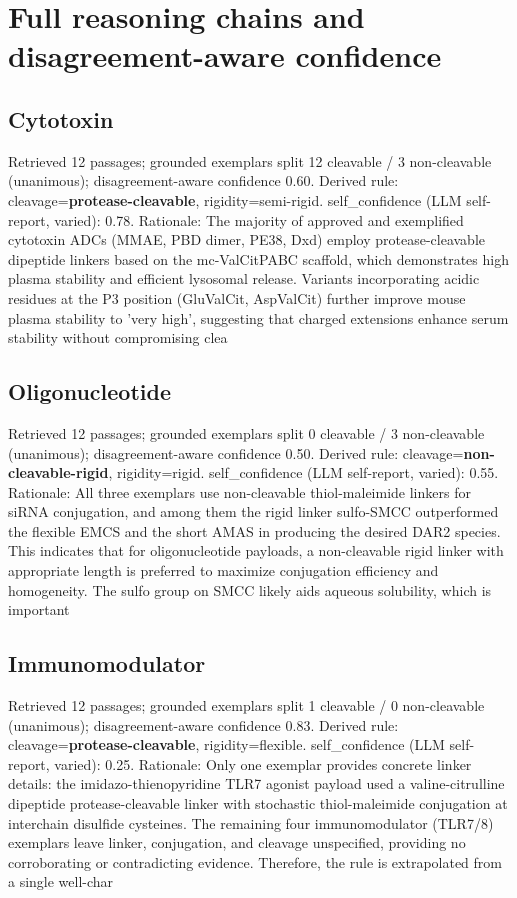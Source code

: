 \documentclass[10pt]{article}
\begin{document}
\section{Full reasoning chains and disagreement-aware confidence}
\subsection{Cytotoxin}
Retrieved 12 passages; grounded exemplars split 12 cleavable / 3 non-cleavable (unanimous); disagreement-aware confidence 0.60. Derived rule: cleavage=\textbf{protease-cleavable}, rigidity=semi-rigid. self\_confidence (LLM self-report, varied): 0.78. Rationale: The majority of approved and exemplified cytotoxin ADCs (MMAE, PBD dimer, PE38, Dxd) employ protease-cleavable dipeptide linkers based on the mc-ValCitPABC scaffold, which demonstrates high plasma stability and efficient lysosomal release. Variants incorporating acidic residues at the P3 position (GluValCit, AspValCit) further improve mouse plasma stability to 'very high', suggesting that charged extensions enhance serum stability without compromising clea
\subsection{Oligonucleotide}
Retrieved 12 passages; grounded exemplars split 0 cleavable / 3 non-cleavable (unanimous); disagreement-aware confidence 0.50. Derived rule: cleavage=\textbf{non-cleavable-rigid}, rigidity=rigid. self\_confidence (LLM self-report, varied): 0.55. Rationale: All three exemplars use non-cleavable thiol-maleimide linkers for siRNA conjugation, and among them the rigid linker sulfo-SMCC outperformed the flexible EMCS and the short AMAS in producing the desired DAR2 species. This indicates that for oligonucleotide payloads, a non-cleavable rigid linker with appropriate length is preferred to maximize conjugation efficiency and homogeneity. The sulfo group on SMCC likely aids aqueous solubility, which is important 
\subsection{Immunomodulator}
Retrieved 12 passages; grounded exemplars split 1 cleavable / 0 non-cleavable (unanimous); disagreement-aware confidence 0.83. Derived rule: cleavage=\textbf{protease-cleavable}, rigidity=flexible. self\_confidence (LLM self-report, varied): 0.25. Rationale: Only one exemplar provides concrete linker details: the imidazo-thienopyridine TLR7 agonist payload used a valine-citrulline dipeptide protease-cleavable linker with stochastic thiol-maleimide conjugation at interchain disulfide cysteines. The remaining four immunomodulator (TLR7/8) exemplars leave linker, conjugation, and cleavage unspecified, providing no corroborating or contradicting evidence. Therefore, the rule is extrapolated from a single well-char
\end{document}
